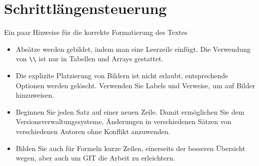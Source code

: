 %
%
%
\chapter{Schrittlängensteuerung\label{chapter:steps}}
\begin{refsection}

Ein paar Hinweise für die korrekte Formatierung des Textes
\begin{itemize}
\item
Absätze werden gebildet, indem man eine Leerzeile einfügt.
Die Verwendung von \verb+\\+ ist nur in Tabellen und Arrays gestattet.
\item
Die explizite Platzierung von Bildern ist nicht erlaubt, entsprechende
Optionen werden gelöscht. 
Verwenden Sie Labels und Verweise, um auf Bilder hinzuweisen.
\item
Beginnen Sie jeden Satz auf einer neuen Zeile. 
Damit ermöglichen Sie dem Versionsverwaltungssysteme, Änderungen
in verschiedenen Sätzen von verschiedenen Autoren ohne Konflikt 
anzuwenden.
\item 
Bilden Sie auch für Formeln kurze Zeilen, einerseits der besseren
Übersicht wegen, aber auch um GIT die Arbeit zu erleichtern.
\end{itemize}






\printbibliography[heading=subbibliography]
\end{refsection}
